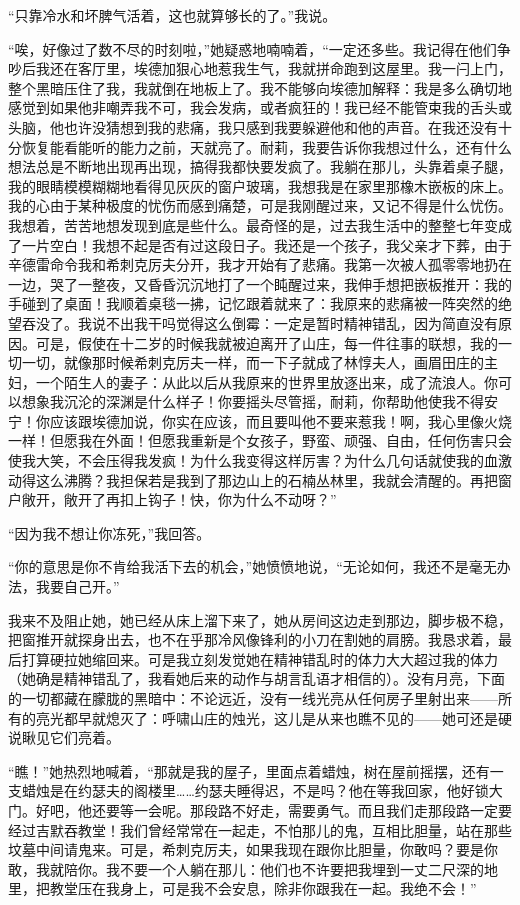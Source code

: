 \par “只靠冷水和坏脾气活着，这也就算够长的了。”我说。
\par “唉，好像过了数不尽的时刻啦，”她疑惑地喃喃着，“一定还多些。我记得在他们争吵后我还在客厅里，埃德加狠心地惹我生气，我就拼命跑到这屋里。我一闩上门，整个黑暗压住了我，我就倒在地板上了。我不能够向埃德加解释：我是多么确切地感觉到如果他非嘲弄我不可，我会发病，或者疯狂的！我已经不能管束我的舌头或头脑，他也许没猜想到我的悲痛，我只感到我要躲避他和他的声音。在我还没有十分恢复能看能听的能力之前，天就亮了。耐莉，我要告诉你我想过什么，还有什么想法总是不断地出现再出现，搞得我都快要发疯了。我躺在那儿，头靠着桌子腿，我的眼睛模模糊糊地看得见灰灰的窗户玻璃，我想我是在家里那橡木嵌板的床上。我的心由于某种极度的忧伤而感到痛楚，可是我刚醒过来，又记不得是什么忧伤。我想着，苦苦地想发现到底是些什么。最奇怪的是，过去我生活中的整整七年变成了一片空白！我想不起是否有过这段日子。我还是一个孩子，我父亲才下葬，由于辛德雷命令我和希刺克厉夫分开，我才开始有了悲痛。我第一次被人孤零零地扔在一边，哭了一整夜，又昏昏沉沉地打了一个盹醒过来，我伸手想把嵌板推开：我的手碰到了桌面！我顺着桌毯一拂，记忆跟着就来了：我原来的悲痛被一阵突然的绝望吞没了。我说不出我干吗觉得这么倒霉：一定是暂时精神错乱，因为简直没有原因。可是，假使在十二岁的时候我就被迫离开了山庄，每一件往事的联想，我的一切一切，就像那时候希刺克厉夫一样，而一下子就成了林惇夫人，画眉田庄的主妇，一个陌生人的妻子：从此以后从我原来的世界里放逐出来，成了流浪人。你可以想象我沉沦的深渊是什么样子！你要摇头尽管摇，耐莉，你帮助他使我不得安宁！你应该跟埃德加说，你实在应该，而且要叫他不要来惹我！啊，我心里像火烧一样！但愿我在外面！但愿我重新是个女孩子，野蛮、顽强、自由，任何伤害只会使我大笑，不会压得我发疯！为什么我变得这样厉害？为什么几句话就使我的血激动得这么沸腾？我担保若是我到了那边山上的石楠丛林里，我就会清醒的。再把窗户敞开，敞开了再扣上钩子！快，你为什么不动呀？”
\par “因为我不想让你冻死，”我回答。
\par “你的意思是你不肯给我活下去的机会，”她愤愤地说，“无论如何，我还不是毫无办法，我要自己开。”
\par 我来不及阻止她，她已经从床上溜下来了，她从房间这边走到那边，脚步极不稳，把窗推开就探身出去，也不在乎那冷风像锋利的小刀在割她的肩膀。我恳求着，最后打算硬拉她缩回来。可是我立刻发觉她在精神错乱时的体力大大超过我的体力（她确是精神错乱了，我看她后来的动作与胡言乱语才相信的）。没有月亮，下面的一切都藏在朦胧的黑暗中：不论远近，没有一线光亮从任何房子里射出来——所有的亮光都早就熄灭了：呼啸山庄的烛光，这儿是从来也瞧不见的——她可还是硬说瞅见它们亮着。
\par “瞧！”她热烈地喊着，“那就是我的屋子，里面点着蜡烛，树在屋前摇摆，还有一支蜡烛是在约瑟夫的阁楼里……约瑟夫睡得迟，不是吗？他在等我回家，他好锁大门。好吧，他还要等一会呢。那段路不好走，需要勇气。而且我们走那段路一定要经过吉默吞教堂！我们曾经常常在一起走，不怕那儿的鬼，互相比胆量，站在那些坟墓中间请鬼来。可是，希刺克厉夫，如果我现在跟你比胆量，你敢吗？要是你敢，我就陪你。我不要一个人躺在那儿：他们也不许要把我埋到一丈二尺深的地里，把教堂压在我身上，可是我不会安息，除非你跟我在一起。我绝不会！”
